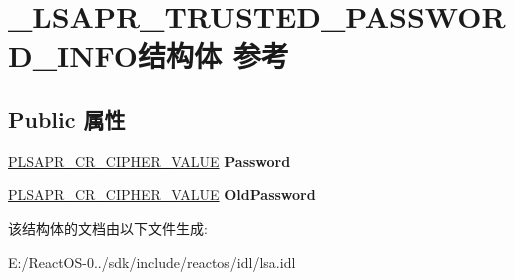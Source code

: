 \hypertarget{struct___l_s_a_p_r___t_r_u_s_t_e_d___p_a_s_s_w_o_r_d___i_n_f_o}{}\section{\+\_\+\+L\+S\+A\+P\+R\+\_\+\+T\+R\+U\+S\+T\+E\+D\+\_\+\+P\+A\+S\+S\+W\+O\+R\+D\+\_\+\+I\+N\+F\+O结构体 参考}
\label{struct___l_s_a_p_r___t_r_u_s_t_e_d___p_a_s_s_w_o_r_d___i_n_f_o}
\subsection*{Public 属性}
\begin{DoxyCompactItemize}
\item 
\mbox{\label{struct___l_s_a_p_r___t_r_u_s_t_e_d___p_a_s_s_w_o_r_d___i_n_f_o_aa2170943682845fd9417b17e983c74a5}} 
\hyperlink{struct___l_s_a_p_r___c_r___c_i_p_h_e_r___v_a_l_u_e}{P\+L\+S\+A\+P\+R\+\_\+\+C\+R\+\_\+\+C\+I\+P\+H\+E\+R\+\_\+\+V\+A\+L\+UE} {\bfseries Password}
\item 
\mbox{\label{struct___l_s_a_p_r___t_r_u_s_t_e_d___p_a_s_s_w_o_r_d___i_n_f_o_a140a74d4579dc4f42fc1db7dd73f6489}} 
\hyperlink{struct___l_s_a_p_r___c_r___c_i_p_h_e_r___v_a_l_u_e}{P\+L\+S\+A\+P\+R\+\_\+\+C\+R\+\_\+\+C\+I\+P\+H\+E\+R\+\_\+\+V\+A\+L\+UE} {\bfseries Old\+Password}
\end{DoxyCompactItemize}


该结构体的文档由以下文件生成\+:\begin{DoxyCompactItemize}
\item 
E\+:/\+React\+O\+S-\/0../sdk/include/reactos/idl/lsa.\+idl\end{DoxyCompactItemize}
